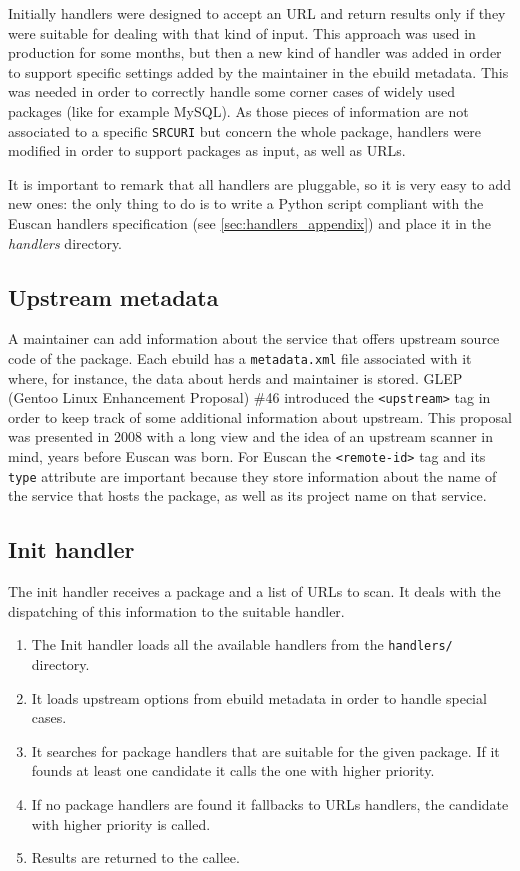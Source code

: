 Initially handlers were designed to accept an URL and return results only if they were suitable for dealing with that kind of input. This approach was used in production for some months, but then a new kind of handler was added in order to support specific settings added by the maintainer in the ebuild metadata. This was needed in order to correctly handle some corner cases of widely used packages (like for example MySQL). As those pieces of information are not associated to a specific \texttt{SRC\textunderscore URI} but concern the whole package, handlers were modified in order to support packages as input, as well as URLs.

It is important to remark that all handlers are pluggable, so it is very easy to add new ones: the only thing to do is to write a Python script compliant with the Euscan handlers specification (see \ref{sec:handlers_appendix}) and place it in the \emph{handlers} directory.

\subsection{Upstream metadata}
A maintainer can add information about the service that offers upstream source code of the package. Each ebuild has a \texttt{metadata.xml} file associated with it where, for instance, the data about herds and maintainer is stored. GLEP (Gentoo Linux Enhancement Proposal) \#46 \cite{glep46} introduced the \texttt{<upstream>} tag in order to keep track of some additional information about upstream. This proposal was presented in 2008 with a long view and the idea of an upstream scanner in mind, years before Euscan was born.
For Euscan the \texttt{<remote-id>} tag and its \texttt{type} attribute are important because they store information about the name of the service that hosts the package, as well as its project name on that service.

\subsection{Init handler}
The init handler receives a package and a list of URLs to scan. It deals with the dispatching of this information to the suitable handler.
\begin{enumerate}
\item The Init handler loads all the available handlers from the \texttt{handlers/} directory.
\item It loads upstream options from ebuild metadata in order to handle special cases.
\item It searches for package handlers that are suitable for the given package. If it founds at least one candidate it calls the one with higher priority.
\item If no package handlers are found it fallbacks to URLs handlers, the candidate with higher priority is called.
\item Results are returned to the callee.
\end{enumerate}

